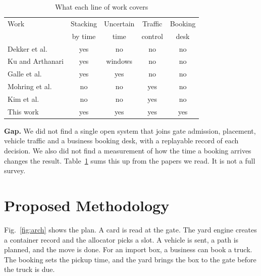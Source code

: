 \documentclass[conference]{IEEEtran}
\begin{document}
\begin{table}[t]
\caption{What each line of work covers}
\label{tab:related}
\centering
\small
\begin{tabular}{lcccc}
\toprule
Work & Stacking & Uncertain & Traffic & Booking \\
 & by time & time & control & desk \\
\midrule
Dekker et al. \cite{dekker2006} & yes & no & no & no \\
Ku and Arthanari \cite{ku2016} & yes & windows & no & no \\
Galle et al. \cite{galle2017} & yes & yes & no & no \\
Mohring et al. \cite{mohring2005} & no & no & yes & no \\
Kim et al. \cite{kim2007} & no & no & yes & no \\
This work & yes & yes & yes & yes \\
\bottomrule
\end{tabular}
\end{table}

\textbf{Gap.} We did not find a single open system that joins gate admission, placement, vehicle traffic and a business booking desk, with a replayable record of each decision. We also did not find a measurement of how the time a booking arrives changes the result. Table~\ref{tab:related} sums this up from the papers we read. It is not a full survey.

\section{Proposed Methodology}
Fig.~\ref{fig:arch} shows the plan. A card is read at the gate. The yard engine creates a container record and the allocator picks a slot. A vehicle is sent, a path is planned, and the move is done. For an import box, a business can book a truck. The booking sets the pickup time, and the yard brings the box to the gate before the truck is due.
\end{document}
